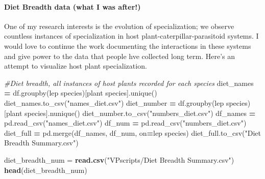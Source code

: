 \documentclass[
]{article}
\newenvironment{Shaded}{\begin{snugshade}}{\end{snugshade}}
\newcommand{\CommentTok}[1]{\textcolor[rgb]{0.56,0.35,0.01}{\textit{#1}}}
\newcommand{\FunctionTok}[1]{\textcolor[rgb]{0.13,0.29,0.53}{\textbf{#1}}}
\newcommand{\NormalTok}[1]{#1}
\newcommand{\OperatorTok}[1]{\textcolor[rgb]{0.81,0.36,0.00}{\textbf{#1}}}
\newcommand{\OtherTok}[1]{\textcolor[rgb]{0.56,0.35,0.01}{#1}}
\newcommand{\StringTok}[1]{\textcolor[rgb]{0.31,0.60,0.02}{#1}}
\begin{document}
\hypertarget{diet-breadth-data-what-i-was-after}{%
\paragraph{Diet Breadth data (what I was
after!)}\label{diet-breadth-data-what-i-was-after}}

One of my research interests is the evolution of specialization; we
observe countless instances of specialization in host
plant-caterpillar-parasitoid systems. I would love to continue the work
documenting the interactions in these systems and give power to the data
that people hve collected long term. Here's an attempt to visualize host
plant specialization.

\begin{Shaded}
\begin{Highlighting}[]
\CommentTok{\#Diet breadth, all instances of host plants recorded for each species }
\NormalTok{diet\_names }\OperatorTok{=}\NormalTok{ df.groupby(}\StringTok{\textquotesingle{}lep species\textquotesingle{}}\NormalTok{)[}\StringTok{\textquotesingle{}plant species\textquotesingle{}}\NormalTok{].unique()}
\NormalTok{diet\_names.to\_csv(}\StringTok{"names\_diet.csv"}\NormalTok{)}
\NormalTok{diet\_number }\OperatorTok{=}\NormalTok{ df.groupby(}\StringTok{\textquotesingle{}lep species\textquotesingle{}}\NormalTok{)[}\StringTok{\textquotesingle{}plant species\textquotesingle{}}\NormalTok{].nunique()}
\NormalTok{diet\_number.to\_csv(}\StringTok{"numbers\_diet.csv"}\NormalTok{)}
\NormalTok{df\_names }\OperatorTok{=}\NormalTok{ pd.read\_csv(}\StringTok{"names\_diet.csv"}\NormalTok{)}
\NormalTok{df\_num }\OperatorTok{=}\NormalTok{ pd.read\_csv(}\StringTok{"numbers\_diet.csv"}\NormalTok{)}
\NormalTok{diet\_full }\OperatorTok{=}\NormalTok{ pd.merge(df\_names, df\_num, on}\OperatorTok{=}\StringTok{\textquotesingle{}lep species\textquotesingle{}}\NormalTok{)}
\NormalTok{diet\_full.to\_csv(}\StringTok{"Diet Breadth Summary.csv"}\NormalTok{)}
\end{Highlighting}
\end{Shaded}

\begin{Shaded}
\begin{Highlighting}[]
\NormalTok{diet\_breadth\_num }\OtherTok{=} \FunctionTok{read.csv}\NormalTok{(}\StringTok{"VPscripts/Diet Breadth Summary.csv"}\NormalTok{)}
\FunctionTok{head}\NormalTok{(diet\_breadth\_num)}
\end{Highlighting}
\end{Shaded}
\end{document}
